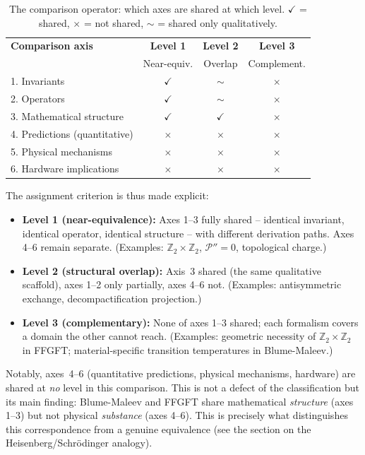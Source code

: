 \begin{table}[htbp]
\centering
\caption{The comparison operator: which axes are shared at which level.
$\checkmark$ = shared, $\times$ = not shared, $\sim$ = shared only
qualitatively.}
\label{tab:operator}
\begin{tabular}{p{5.5cm}ccc}
\toprule
\textbf{Comparison axis} & \textbf{Level 1} & \textbf{Level 2} & \textbf{Level 3} \\
 & Near-equiv. & Overlap & Complement. \\
\midrule
1. Invariants            & $\checkmark$ & $\sim$       & $\times$ \\
2. Operators             & $\checkmark$ & $\sim$       & $\times$ \\
3. Mathematical structure & $\checkmark$ & $\checkmark$ & $\times$ \\
4. Predictions (quantitative) & $\times$ & $\times$    & $\times$ \\
5. Physical mechanisms   & $\times$     & $\times$     & $\times$ \\
6. Hardware implications & $\times$     & $\times$     & $\times$ \\
\bottomrule
\end{tabular}
\end{table}

\noindent The assignment criterion is thus made explicit:
\begin{itemize}
  \item \textbf{Level 1 (near-equivalence):} Axes 1--3 fully shared --
        identical invariant, identical operator, identical structure --
        with different derivation paths. Axes 4--6 remain separate.
        (Examples: $\mathbb{Z}_2\times\mathbb{Z}_2$, $\mathcal{P}''=0$,
        topological charge.)
  \item \textbf{Level 2 (structural overlap):} Axis~3 shared
        (the same qualitative scaffold), axes 1--2 only partially, axes
        4--6 not. (Examples: antisymmetric exchange,
        decompactification projection.)
  \item \textbf{Level 3 (complementary):} None of axes 1--3 shared;
        each formalism covers a domain the other cannot reach.
        (Examples: geometric necessity of
        $\mathbb{Z}_2\times\mathbb{Z}_2$ in FFGFT; material-specific
        transition temperatures in Blume-Maleev.)
\end{itemize}

Notably, axes~4--6 (quantitative predictions, physical mechanisms,
hardware) are shared at \emph{no} level in this comparison. This is not
a defect of the classification but its main finding: Blume-Maleev and
FFGFT share mathematical \emph{structure} (axes 1--3) but not physical
\emph{substance} (axes 4--6). This is precisely what distinguishes this
correspondence from a genuine equivalence
(see the section on the Heisenberg/Schrödinger analogy).

